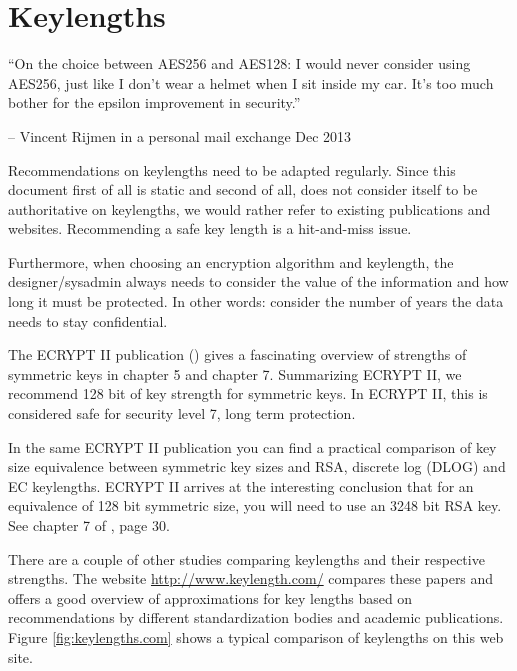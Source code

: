 \section{Keylengths}
\label{section:keylengths}


\epigraph{``On the choice between AES256 and AES128: I would never consider
using AES256, just like I don't wear a helmet when I sit inside my car. It's
too much bother for the epsilon improvement in security.''}{-- Vincent Rijmen
in a personal mail exchange Dec 2013}

Recommendations on keylengths need to be adapted regularly. Since this document
first of all is static and second of all, does not consider itself to be
authoritative on keylengths, we would rather refer to existing publications and
websites.  Recommending a safe key length is a hit-and-miss issue.

Furthermore, when choosing an encryption algorithm and keylength, the
designer/sysadmin always needs to consider the value of the information and how
long it must be protected.  In other words: consider the number of years the
data needs to stay confidential.


The ECRYPT II publication (\cite{ii2011ecrypt}) gives a fascinating overview of
strengths of symmetric keys in chapter 5 and chapter 7. Summarizing ECRYPT II, we
recommend 128 bit of key strength for symmetric keys. In ECRYPT II, this is
considered safe for security level 7, long term protection.

In the same ECRYPT II publication you can find a practical comparison of key size
equivalence between symmetric key sizes and RSA, discrete log (DLOG) and EC
keylengths. ECRYPT II arrives at the interesting conclusion that for an
equivalence of 128 bit symmetric size, you will need to use an 3248 bit RSA
key. See chapter 7 of \cite{ii2011ecrypt}, page 30.


There are a couple of other studies comparing keylengths and their respective
strengths.  The website \url{http://www.keylength.com/} compares these papers
and offers a good overview of approximations for key lengths based on
recommendations by different standardization bodies and academic publications.
Figure \ref{fig:keylengths.com} shows a typical comparison of keylengths on
this web site.

